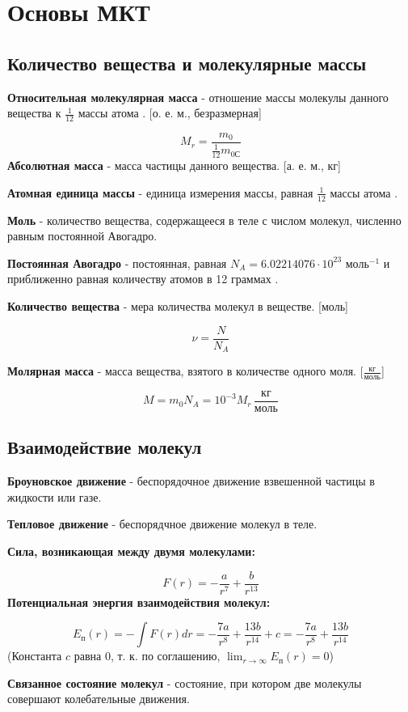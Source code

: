 \section{Основы МКТ}

\subsection{Количество вещества и молекулярные массы}
\textbf{Относительная молекулярная масса} - отношение массы молекулы данного вещества к $\frac{1}{12}$ массы атома . [о. е. м., безразмерная]\par
\[M_r=\frac{m_0}{\frac{1}{12}m_{0\text{С}}}\]
\textbf{Абсолютная масса} - масса частицы данного вещества. [а. е. м., кг]\par
\textbf{Атомная единица массы} - единица измерения массы, равная $\frac{1}{12}$ массы атома .\par

\textbf{Моль} - количество вещества, содержащееся в теле с числом молекул, численно равным постоянной Авогадро.\par
\textbf{Постоянная Авогадро} - постоянная, равная $N_A=6.02214076\cdot10^{23}\text{ моль}^{-1}$ и приближенно равная количеству атомов в 12 граммах .\par
\textbf{Количество вещества} - мера количества молекул в веществе. [моль]\par
\[\nu=\frac{N}{N_A}\]

\textbf{Молярная масса} - масса вещества, взятого в количестве одного моля. [$\frac{\text{кг}}{\text{моль}}$]\par
\[M = m_0 N_A = 10^{-3}M_r\,\textstyle \frac{\text{кг}}{\text{моль}}\]



\subsection{Взаимодействие молекул}
\textbf{Броуновское движение} - беспорядочное движение взвешенной частицы в жидкости или газе.\par
\textbf{Тепловое движение} - беспорядчное движение молекул в теле.\par
\textbf{Сила, возникающая между двумя молекулами:}\par
\[F(r)=-\frac{a}{r^7}+\frac{b}{r^{13}}\]
\textbf{Потенциальная энергия взаимодействия молекул:}\par
\[E_{\text{п}}(r) = -\int F(r) dr = -\frac{7a}{r^8}+\frac{13b}{r^{14}}+c = -\frac{7a}{r^8}+\frac{13b}{r^{14}}\]
(Константа $c$ равна $0$, т. к. по соглашению, $\displaystyle \lim_{r\to\infty}{E_{\text{п}}(r)}=0$)\par
\textbf{Связанное состояние молекул} - состояние, при котором две молекулы совершают колебательные движения.\par